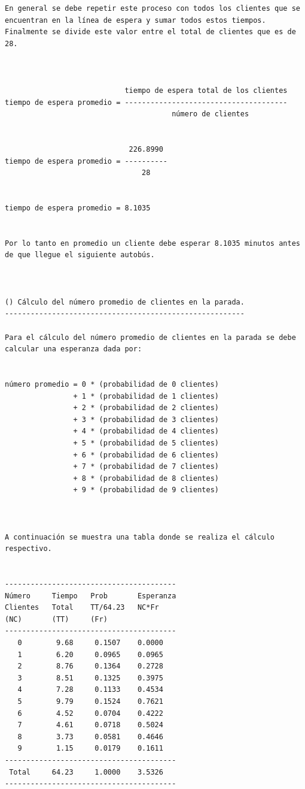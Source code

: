 \begin{verbatim}
En general se debe repetir este proceso con todos los clientes que se encuentran en la línea de espera y sumar todos estos tiempos. Finalmente se divide este valor entre el total de clientes que es de 28.   



                            tiempo de espera total de los clientes
tiempo de espera promedio = --------------------------------------
                                       número de clientes


                             226.8990
tiempo de espera promedio = ----------  
                                28


tiempo de espera promedio = 8.1035


Por lo tanto en promedio un cliente debe esperar 8.1035 minutos antes de que llegue el siguiente autobús.



() Cálculo del número promedio de clientes en la parada.
--------------------------------------------------------

Para el cálculo del número promedio de clientes en la parada se debe calcular una esperanza dada por:


número promedio = 0 * (probabilidad de 0 clientes)
                + 1 * (probabilidad de 1 clientes)
                + 2 * (probabilidad de 2 clientes)
                + 3 * (probabilidad de 3 clientes)
                + 4 * (probabilidad de 4 clientes)
                + 5 * (probabilidad de 5 clientes)
                + 6 * (probabilidad de 6 clientes)
                + 7 * (probabilidad de 7 clientes)
                + 8 * (probabilidad de 8 clientes)
                + 9 * (probabilidad de 9 clientes)



A continuación se muestra una tabla donde se realiza el cálculo respectivo.


----------------------------------------
Número     Tiempo   Prob       Esperanza
Clientes   Total    TT/64.23   NC*Fr
(NC)       (TT)     (Fr)
----------------------------------------
   0        9.68     0.1507    0.0000
   1        6.20     0.0965    0.0965
   2        8.76     0.1364    0.2728
   3        8.51     0.1325    0.3975
   4        7.28     0.1133    0.4534
   5        9.79     0.1524    0.7621
   6        4.52     0.0704    0.4222
   7        4.61     0.0718    0.5024
   8        3.73     0.0581    0.4646
   9        1.15     0.0179    0.1611
----------------------------------------
 Total     64.23     1.0000    3.5326
----------------------------------------




\end{verbatim}
